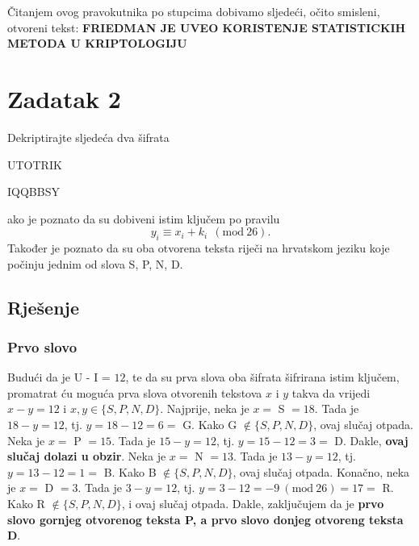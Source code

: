 \documentclass[a4paper,12pt,oneside]{article}
\begin{document}
\noindent Čitanjem ovog pravokutnika po stupcima dobivamo sljedeći, očito smisleni, otvoreni tekst:
\newline\newline
\textbf{FRIEDMAN JE UVEO KORISTENJE STATISTICKIH METODA U KRIPTOLOGIJU}

\section*{Zadatak 2}
Dekriptirajte sljedeća dva šifrata
\begin{center}
UTOTRIK
\end{center}
\begin{center}
IQQBBSY
\end{center}
ako je poznato da su dobiveni istim ključem po pravilu
$$y_i \equiv x_i + k_i \ \ (\text{mod} \ 26).$$
Također je poznato da su oba otvorena teksta riječi na hrvatskom
jeziku koje počinju jednim od slova S, P, N, D.


\subsection*{Rješenje}
\subsubsection*{Prvo slovo}
Budući da je U - I = $12$, te da su prva slova oba šifrata šifrirana istim ključem, promatrat ću moguća prva slova otvorenih tekstova $x$ i $y$ takva da vrijedi $x - y = 12$ i $x, y \in \{S, P, N ,D\}$.
\newline \newline
Najprije, neka je $x =$ S $= 18$. Tada je $18 - y = 12$, tj. $y = 18 - 12 = 6 =$ G. Kako G $\notin \{S, P, N ,D\}$, ovaj slučaj otpada.
\newline \newline
Neka je $x =$ P $= 15$. Tada je $15 - y = 12$, tj. $y = 15 - 12 = 3 =$ D. Dakle, \textbf{ovaj slučaj dolazi u obzir}.
\newline \newline
Neka je $x =$ N $= 13$. Tada je $13 - y = 12$, tj. $y = 13 - 12 = 1 =$ B. Kako B  $\notin \{S, P, N ,D\}$, ovaj slučaj otpada.
\newline \newline
Konačno, neka je $x =$ D $= 3$. Tada je $3 - y = 12$, tj. $y = 3 - 12 = -9 \ (\text{mod} \ 26) = 17 = $ R. Kako R  $\notin \{S, P, N ,D\}$, i ovaj slučaj otpada.
\newline \newline
Dakle, zaključujem da je \textbf{prvo slovo gornjeg otvorenog teksta P, a prvo slovo donjeg otvoreng teksta D}.
\end{document}
